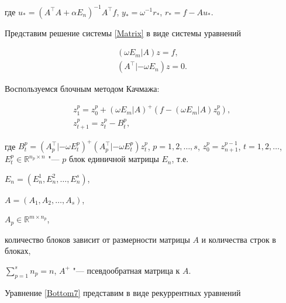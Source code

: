 где $u_{\ast}=(A^{\top}A+\alpha E_{n})^{-1}A^{\top}f$, $y_{\ast}=\omega^{-1}r_{\ast}$, $r_{\ast}=f-Au_{\ast}$.



\smallskip




Представим решение системы \eqref{Matrix} в виде системы уравнений

\begin{gather}

(\omega E_{m} | A)z=f,

\label{High}

\\

(A^{\top} | -\omega E_{n})z=0.

\label{Bottom}

\end{gather}



Воспользуемся блочным методом Качмажа:

\begin{gather}

z^{p}_{1}=z^{p}_{0}+(\omega E_{m}|A)^{+}

(f-(\omega E_{m}|A)z^{p}_{0}),

\label{High6}

\\

z^{p}_{t+1}=z^{p}_{t}-B^{p}_{t},

\label{Bottom7}

\end{gather}

где $B^{p}_{t}=(A^{\top}_{p}|-\omega E^{p}_{t})^{+}(A^{\top}_{p}|-\omega E^{p}_{t})z^{p}_{t}$, $p=1,2,\ldots,s$, $z^{p}_{0}=z^{p-1}_{n+1}$, $t=1, 2, \ldots$, $E^{p}_{t}\in \mathbb R^{n_{p}\times n}$ "--- $p$ блок единичной матрицы $E_{n}$, т.е.

$E_{n}=(E^{1}_{n}, E^{2}_{n}, \ldots, E^{s}_{n})$,

$A=(A_{1}, A_{2}, \ldots, A_{s})$,

$A_{p}\in \mathbb  R^{m\times n_{p}}$,

количество блоков зависит от размерности матрицы $A$ и количества строк в блоках,

$\sum _{p=1}^{s}n_{p}=n$, $A^{+}$ "--- псевдообратная матрица к $A$.



Уравнение \eqref{Bottom7} представим в виде рекуррентных уравнений

